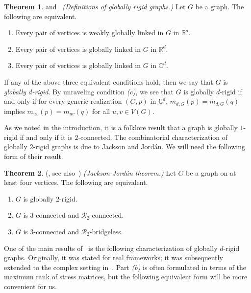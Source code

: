 \documentclass[11pt,a4paper,dvipsnames]{scrartcl}
\theoremstyle{definition}
\newtheorem{theorem}{Theorem}[section]
\newcommand{\RR}{\mathbb{R}}
\newcommand{\CC}{\mathbb{C}}
\newcommand{\globrig}[1]{globally $#1$-rigid}
\begin{document}
\begin{theorem}\cite[Lemma 3.2]{jordan.villanyi_2023} and~\cite[Theorem 1]{gortler.thurston_2014a} \emph{(Definitions of globally rigid graphs.)} \newline
    Let $G$ be a graph. The following are equivalent.
    \begin{enumerate}
        \item Every pair of vertices is weakly globally linked in $G$ in $\RR^d$.
        \item Every pair of vertices is globally linked in $G$ in $\RR^d$.
        \item Every pair of vertices is globally linked in $G$ in $\CC^d$.
    \end{enumerate}
\end{theorem}

If any of the above three equivalent conditions hold, then we say that $G$ is \emph{\globrig{d}}. By unraveling condition \textit{(c)}, we see that $G$ is globally $d$-rigid if and only if for every generic realization $(G,p)$ in $\CC^d$, $m_{d,G}(p) = m_{d,G}(q)$ implies $m_{uv}(p) = m_{uv}(q)$ for all $u,v \in V(G)$.

As we noted in the introduction, it is a folklore result that a graph is \globrig{1} if and only if it is $2$-connected. The combinatorial characterization of \globrig{2} graphs is due to Jackson and Jordán. We will need the following form of their result.

\begin{theorem}\label{theorem:2dimglobrigidchar} (\cite{jackson.jordan_2005}, see also~\cite[Theorem 5.1]{jackson.etal_2006}) \emph{(Jackson-Jordán theorem.)} \newline
    Let $G$ be a graph on at least four vertices. The following are equivalent.
    \begin{enumerate}
        \item $G$ is \globrig{2}.
        \item $G$ is $3$-connected and $\mathcal{R}_2$-connected.
        \item $G$ is $3$-connected and $\mathcal{R}_2$-bridgeless.
    \end{enumerate}
\end{theorem}

One of the main results of~\cite{gortler.etal_2010} is the following characterization of \globrig{d} graphs. Originally, it was stated for real frameworks; it was subsequently extended to the complex setting in~\cite{gortler.thurston_2014a}. Part \textit{(b)} is often formulated in terms of the maximum rank of stress matrices, but the following equivalent form will be more convenient for us. %
\end{document}
